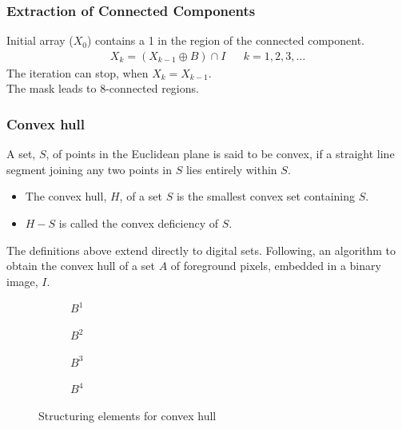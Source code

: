 \subsubsection{Extraction of Connected Components}
\begin{multicols}{2}
Initial array ($X_0$) contains a 1 in the region of the connected component.
\begin{align*}
X_k=(X_{k-1}\oplus B)\cap I && k=1,2,3,\ldots
\end{align*}
The iteration can stop, when $X_k = X_{k-1}$. \\
The mask \quad {}
\quad leads to 8-connected regions.
\end{multicols}

\subsubsection{Convex hull}
A set, $S$, of points in the Euclidean plane is said to be convex, if a straight line segment joining any two points in $S$ lies entirely within $S$.
\begin{itemize}
\item The convex hull, $H$, of a set $S$ is the smallest convex set containing $S$.
\item $H-S$ is called the convex deficiency of $S$.
\end{itemize}
The definitions above extend directly to digital sets.
Following, an algorithm to obtain the convex hull of a set $A$ of foreground pixels, embedded in a binary image, $I$.
\begin{figure}[h]
	\centering
	\begin{subfigure}[b]{0.2\textwidth}
		\centering
		\caption{$B^1$}
	\end{subfigure}
	\begin{subfigure}[b]{0.2\textwidth}
		\centering
		\caption{$B^2$}
	\end{subfigure}
	\begin{subfigure}[b]{0.2\textwidth}
		\centering
		\caption{$B^3$}
	\end{subfigure}
	\begin{subfigure}[b]{0.2\textwidth}
		\centering
		\caption{$B^4$}
	\end{subfigure}
	\caption{Structuring elements for convex hull}
\end{figure}

